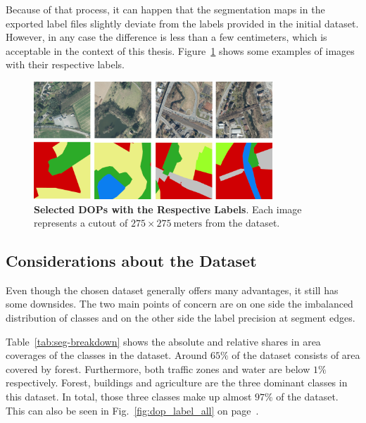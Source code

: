 Because of that process, it can happen that the segmentation maps in the exported label files slightly deviate from the labels provided in the initial dataset. However, in any case the difference is less than a few centimeters, which is acceptable in the context of this thesis. Figure~\ref{fig:dop_with_labels} shows some examples of images with their respective labels.

\begin{figure}[b]
    \centering
    \includegraphics[width=0.8\textwidth]{images/dop_plus_label}
    \caption[Selected DOPs with the Respective Labels]
    {\textbf{Selected DOPs with the Respective Labels}. Each image represents a cutout of $275\times 275~\text{meters}$ from the dataset. }
    \label{fig:dop_with_labels}
\end{figure}

\subsection{Considerations about the Dataset}
\label{sec:dataset_considerations}

Even though the chosen dataset generally offers many advantages, it still has some downsides. The two main points of concern are on one side the imbalanced distribution of classes and on the other side the label precision at segment edges.

Table~\ref{tab:seg-breakdown} shows the absolute and relative shares in area coverages of the classes in the dataset. Around $65\%$ of the dataset consists of area covered by forest. Furthermore, both traffic zones and water are below $1\%$ respectively. Forest, buildings and agriculture are the three dominant classes in this dataset. In total, those three classes make up almost $97\%$ of the dataset. This can also be seen in Fig.~\ref{fig:dop_label_all} on page~\pageref{fig:dop_label_all}.

